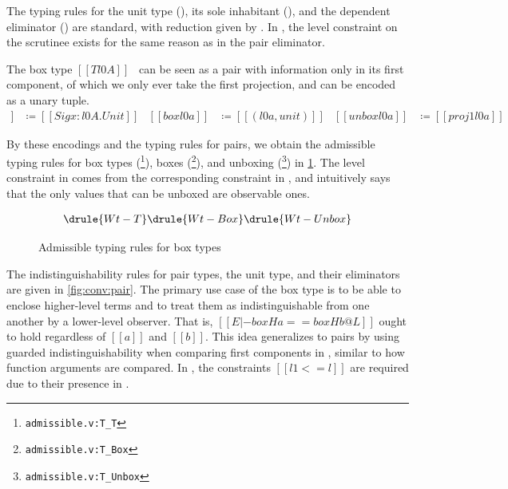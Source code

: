 \documentclass[acmsmall, screen=true, nonacm=true,
  review=\ifpublic false\else true\fi,
  anonymous=\ifanonymous true\else false\fi
]{acmart}
\newcommand{\suppl}[3]{{\scriptsize\texttt{#2:#3}}}
\begin{document}
The typing rules for the unit type (),
its sole inhabitant (),
and the dependent eliminator () are standard,
with reduction given by .
In , the level constraint on the scrutinee exists
for the same reason as in the pair eliminator.

The box type $[[T l0 A]]$~\citep{abadi:dcc}
can be seen as a pair with information only in its first component,
of which we only ever take the first projection,
and can be encoded as a unary tuple.
%
{
\setlength{\abovedisplayskip}{0pt}
\setlength{\belowdisplayskip}{0pt}
\begin{align*}
  [[T l0 A]] &\coloneqq [[Sig x : l0 A . Unit]] &
  [[box l0 a]] &\coloneqq [[(l0 a, unit)]] &
  [[unbox l0 a]] &\coloneqq [[proj1 l0 a]]
\end{align*}
}

By these encodings and the typing rules for pairs,
we obtain the admissible typing rules for box types
(\footnote{\suppl{theories}{admissible.v}{T\_T}}),
boxes (\footnote{\suppl{theories}{admissible.v}{T\_Box}}),
and unboxing (\footnote{\suppl{theories}{admissible.v}{T\_Unbox}})
in \cref{fig:typing:box}.
The level constraint in  comes from the corresponding constraint in ,
and intuitively says that the only values that can be unboxed are observable ones.

\begin{figure}[h]
  \begin{gather*}
    \drule{Wt-T}
    \drule{Wt-Box}
    \drule{Wt-Unbox}
  \end{gather*}
  \caption{Admissible typing rules for box types}
  \Description{}
  \label{fig:typing:box}
\end{figure}

The indistinguishability rules for pair types, the unit type, and their eliminators
are given in \cref{fig:conv:pair}.
The primary use case of the box type is to be able to enclose higher-level terms
and to treat them as indistinguishable from one another by a lower-level observer.
That is, $[[E |- box H a == box H b @ L]]$ ought to hold regardless of $[[a]]$ and $[[b]]$.
This idea generalizes to pairs by using guarded indistinguishability
when comparing first components in ,
similar to how function arguments are compared.
In , the constraints $[[l1 <= l]]$
are required due to their presence in .
\end{document}
